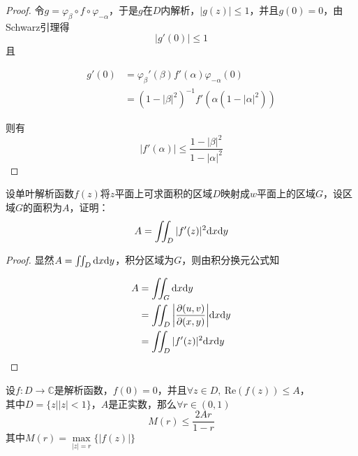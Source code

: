 \begin{proof}
    
    令$g = \varphi_{\beta}\circ f \circ \varphi_{-\alpha}$，于是$g$在$D$内解析，$|g(z)| \leq 1$，并且$g(0) = 0$，由\textup{Schwarz}引理得
    $$|g'(0)| \leq 1$$
    且
    
    \begin{align*}
        g'(0) & = \varphi_{\beta}'(\beta) f'(\alpha) \varphi_{-\alpha}(0)\\
        & =  (1 -|\beta|^2)^{-1}f'(\alpha (1 - |\alpha|^2))
    \end{align*}

    则有
    $$|f'(\alpha)| \leq \dfrac{1-|\beta|^2}{1 - |\alpha|^2}$$

\end{proof}

\begin{proposition}
    
    设单叶解析函数$f(z)$将$z$平面上可求面积的区域$D$映射成$w$平面上的区域$G$，设区域$G$的面积为$A$，证明：
    $$ A = \iint_{D}{|f'(z)|^2}\mathrm{d} x\mathrm{d} y$$

\end{proposition}

\begin{proof}
    
    显然$A = \iint_{D}\mathrm{d} x\mathrm{d} y$，积分区域为$G$，则由积分换元公式知

    \begin{align*}
        A & = \iint_{G}\mathrm{d} x\mathrm{d} y \\
          & = \iint_{D}{\left|\dfrac{\partial(u,v)}{\partial(x,y)}\right|}\mathrm{d} x\mathrm{d} y \\
          & = \iint_{D}{|f'(z)|^2}\mathrm{d} x\mathrm{d} y
    \end{align*}

\end{proof}

\begin{proposition}
    
    设$f:D\to\mathbb{C}$是解析函数，$f(0) = 0$，并且$\forall z \in D,\ \mathrm{Re}(f(z)) \leq A$，\\
    其中$D = \{z \big| |z| < 1\}$，$A$是正实数，那么$\forall r \in (0,1)$
    $$M(r) \leq \dfrac{2Ar}{1-r}$$
    其中$M(r) = \max\limits_{|z|=r}\{|f(z)|\}$

\end{proposition}

